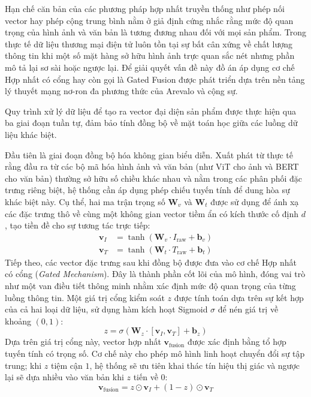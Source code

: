 Hạn chế căn bản của các phương pháp hợp nhất truyền thống như phép nối vector hay phép cộng trung bình nằm ở giả định cứng nhắc rằng mức độ quan trọng của hình ảnh và văn bản là tương đương nhau đối với mọi sản phẩm. Trong thực tế dữ liệu thương mại điện tử luôn tồn tại sự bất cân xứng về chất lượng thông tin khi một số mặt hàng sở hữu hình ảnh trực quan sắc nét nhưng phần mô tả lại sơ sài hoặc ngược lại. Để giải quyết vấn đề này đồ án áp dụng cơ chế Hợp nhất có cổng hay còn gọi là Gated Fusion được phát triển dựa trên nền tảng lý thuyết mạng nơ-ron đa phương thức của Arevalo và cộng sự\cite{24}.

Quy trình xử lý dữ liệu để tạo ra vector đại diện sản phẩm được thực hiện qua ba giai đoạn tuần tự, đảm bảo tính đồng bộ về mặt toán học giữa các luồng dữ liệu khác biệt.

Đầu tiên là giai đoạn đồng bộ hóa không gian biểu diễn. Xuất phát từ thực tế rằng đầu ra từ các bộ mã hóa hình ảnh và văn bản (như ViT cho ảnh và BERT cho văn bản) thường sở hữu số chiều khác nhau và nằm trong các phân phối đặc trưng riêng biệt, hệ thống cần áp dụng phép chiếu tuyến tính để dung hòa sự khác biệt này. Cụ thể, hai ma trận trọng số $\mathbf{W}_v$ và $\mathbf{W}_t$ được sử dụng để ánh xạ các đặc trưng thô về cùng một không gian vector tiềm ẩn có kích thước cố định $d$, tạo tiền đề cho sự tương tác trực tiếp:
\begin{align}
    \mathbf{v}_I &= \tanh(\mathbf{W}_v \cdot I_{\text{raw}} + \mathbf{b}_v) \\
    \mathbf{v}_T &= \tanh(\mathbf{W}_t \cdot T_{\text{raw}} + \mathbf{b}_t)
\end{align}
Tiếp theo, các vector đặc trưng sau khi đồng bộ được đưa vào cơ chế Hợp nhất có cổng (\textit{Gated Mechanism}). Đây là thành phần cốt lõi của mô hình, đóng vai trò như một van điều tiết thông minh nhằm xác định mức độ quan trọng của từng luồng thông tin. Một giá trị cổng kiểm soát $z$ được tính toán dựa trên sự kết hợp của cả hai loại dữ liệu, sử dụng hàm kích hoạt Sigmoid $\sigma$ để nén giá trị về khoảng $(0, 1)$:
\begin{equation}
    z = \sigma(\mathbf{W}_z \cdot [\mathbf{v}_I, \mathbf{v}_T] + \mathbf{b}_z)
\end{equation}
Dựa trên giá trị cổng này, vector hợp nhất $\mathbf{v}_{\text{fusion}}$ được xác định bằng tổ hợp tuyến tính có trọng số. Cơ chế này cho phép mô hình linh hoạt chuyển đổi sự tập trung; khi $z$ tiệm cận $1$, hệ thống sẽ ưu tiên khai thác tín hiệu thị giác và ngược lại sẽ dựa nhiều vào văn bản khi $z$ tiến về $0$:
\begin{equation}
    \mathbf{v}_{\text{fusion}} = z \odot \mathbf{v}_I + (1 - z) \odot \mathbf{v}_T
\end{equation}

